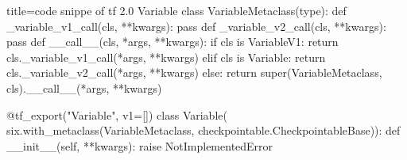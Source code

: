 
\begin{frame}[fragile]
    \begin{tcblisting}{title=code snippe of tf 2.0 Variable}
            class VariableMetaclass(type):
              def _variable_v1_call(cls, **kwargs):
                pass
              def _variable_v2_call(cls, **kwargs):
                pass
              def __call__(cls, *args, **kwargs):
                if cls is VariableV1:
                  return cls._variable_v1_call(*args, **kwargs)
                elif cls is Variable:
                  return cls._variable_v2_call(*args, **kwargs)
                else:
                  return super(VariableMetaclass, cls).__call__(*args,
                                                                **kwargs)

            @tf_export("Variable", v1=[])
            class Variable(
                six.with_metaclass(VariableMetaclass,
                                   checkpointable.CheckpointableBase)):
              def __init__(self, **kwargs):
                raise NotImplementedError
    \end{tcblisting}
\end{frame}
